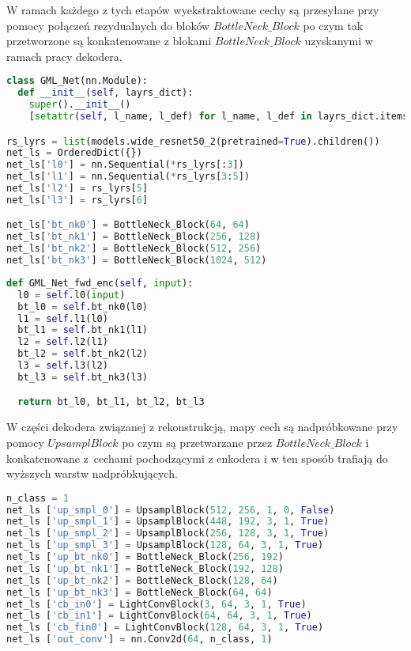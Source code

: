 W ramach każdego z tych etapów wyekstraktowane cechy są przesyłane przy pomocy połączeń rezydualnych do bloków $\textit{BottleNeck$\_$Block}$ po czym tak przetworzone są konkatenowane z blokami $\textit{BottleNeck$\_$Block}$ uzyskanymi w ramach pracy dekodera.


\cell
\begin{lstlisting}[name=Rozdzial3.1, language=Python]
class GML_Net(nn.Module):
  def __init__(self, layrs_dict):
    super().__init__()
    [setattr(self, l_name, l_def) for l_name, l_def in layrs_dict.items()]

rs_lyrs = list(models.wide_resnet50_2(pretrained=True).children())
net_ls = OrderedDict({})
net_ls['l0'] = nn.Sequential(*rs_lyrs[:3])
net_ls['l1'] = nn.Sequential(*rs_lyrs[3:5])
net_ls['l2'] = rs_lyrs[5]
net_ls['l3'] = rs_lyrs[6]

net_ls['bt_nk0'] = BottleNeck_Block(64, 64)
net_ls['bt_nk1'] = BottleNeck_Block(256, 128)
net_ls['bt_nk2'] = BottleNeck_Block(512, 256)
net_ls['bt_nk3'] = BottleNeck_Block(1024, 512)
\end{lstlisting}


\cell


\cell
\begin{lstlisting}[name=Rozdzial3.1, language=Python]
def GML_Net_fwd_enc(self, input):
  l0 = self.l0(input)
  bt_l0 = self.bt_nk0(l0)
  l1 = self.l1(l0)
  bt_l1 = self.bt_nk1(l1)
  l2 = self.l2(l1)
  bt_l2 = self.bt_nk2(l2)
  l3 = self.l3(l2)
  bt_l3 = self.bt_nk3(l3)

  return bt_l0, bt_l1, bt_l2, bt_l3
\end{lstlisting}


\cell
W części dekodera związanej z rekonstrukcją, mapy cech są nadpróbkowane przy pomocy $\textit{UpsamplBlock}$ po czym są przetwarzane przez $\textit{BottleNeck$\_$Block}$ i konkatenowane z~cechami pochodzącymi z enkodera i w ten sposób trafiają do wyższych warstw nadpróbkujących.

\cell
\begin{lstlisting}[name=Rozdzial3.1, language=Python]
n_class = 1
net_ls ['up_smpl_0'] = UpsamplBlock(512, 256, 1, 0, False)
net_ls ['up_smpl_1'] = UpsamplBlock(448, 192, 3, 1, True)
net_ls ['up_smpl_2'] = UpsamplBlock(256, 128, 3, 1, True)
net_ls ['up_smpl_3'] = UpsamplBlock(128, 64, 3, 1, True)
net_ls ['up_bt_nk0'] = BottleNeck_Block(256, 192)
net_ls ['up_bt_nk1'] = BottleNeck_Block(192, 128)
net_ls ['up_bt_nk2'] = BottleNeck_Block(128, 64)
net_ls ['up_bt_nk3'] = BottleNeck_Block(64, 64)
net_ls ['cb_in0'] = LightConvBlock(3, 64, 3, 1, True)
net_ls ['cb_in1'] = LightConvBlock(64, 64, 3, 1, True)
net_ls ['cb_fin0'] = LightConvBlock(128, 64, 3, 1, True)
net_ls ['out_conv'] = nn.Conv2d(64, n_class, 1)
\end{lstlisting}



